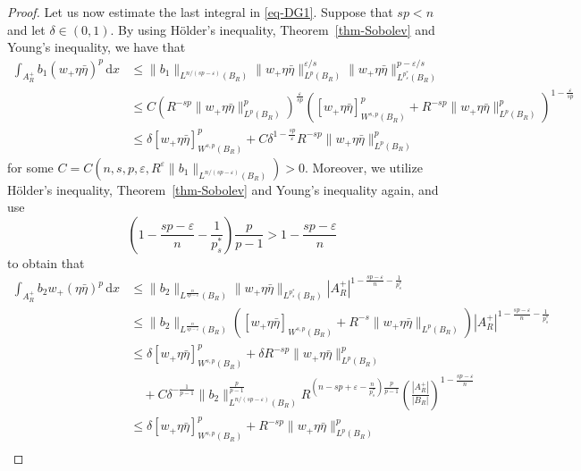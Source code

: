 \documentclass[11pt]{amsart}
\theoremstyle{plain}
\theoremstyle{definition}
\numberwithin{equation}{section}
\begin{document}
\begin{proof}
Let us now estimate the last integral in \eqref{eq-DG1}. Suppose that $sp < n$ and let $\delta \in (0,1)$. By using H\"older's inequality, Theorem~\ref{thm-Sobolev} and Young's inequality, we have that
\begin{equation*}
\begin{split}
\int_{A^+_R} b_1 (w_+\eta\bar{\eta})^{p} \,\mathrm{d}x
&\leq \|b_1\|_{L^{n/(sp-\varepsilon)}(B_R)} \|w_+\eta\bar{\eta}\|_{L^p(B_R)}^{\varepsilon/s} \|w_+\eta\bar{\eta}\|_{L^{p^{\ast}_{s}}(B_R)}^{p-\varepsilon/s} \\
&\leq C \left( R^{-sp} \|w_+\eta\bar{\eta}\|_{L^p(B_R)}^p \right)^{\frac{\varepsilon}{sp}} \left( [w_+\eta\bar{\eta}]_{W^{s, p}(B_R)}^p + R^{-sp} \|w_+\eta\bar{\eta}\|_{L^p(B_R)}^p \right)^{1-\frac{\varepsilon}{sp}} \\
&\leq \delta [w_+\eta\bar{\eta}]_{W^{s, p}(B_R)}^p + C \delta^{1-\frac{sp}{\varepsilon}} R^{-sp} \|w_+\eta\bar{\eta}\|_{L^p(B_R)}^p
\end{split}
\end{equation*}
for some $C=C(n, s, p, \varepsilon, R^\varepsilon \|b_1\|_{L^{n/(sp-\varepsilon)}(B_R)})>0$. Moreover, we utilize H\"older's inequality, Theorem~\ref{thm-Sobolev} and Young's inequality again, and use
\begin{equation*}
    \left(1-\frac{sp-\varepsilon}{n}-\frac{1}{p_s^{\ast}}\right)\frac{p}{p-1}>1-\frac{sp-\varepsilon}{n}
\end{equation*}
to obtain that
\begin{equation*}
\begin{split}
\int_{A^+_R} b_2 w_+ (\eta\bar{\eta})^p \,\mathrm{d}x
&\leq \|b_2\|_{L^{\frac{n}{sp-\varepsilon}}(B_R)} \|w_+\eta\bar{\eta}\|_{L^{p^{\ast}_{s}}(B_R)}|A^+_R|^{1-\frac{sp-\varepsilon}{n}-\frac{1}{p_s^{\ast}}}\\
&\leq \|b_2\|_{L^{\frac{n}{sp-\varepsilon}}(B_R)} \left( [w_+\eta\bar{\eta}]_{W^{s,p}(B_R)}+R^{-s}\|w_+\eta\bar{\eta}\|_{L^{p}(B_R)}\right) |A^+_R|^{1-\frac{sp-\varepsilon}{n}-\frac{1}{p_s^{\ast}}} \\
&\leq \delta [w_+\eta\bar{\eta}]_{W^{s, p}(B_R)}^p + \delta R^{-sp} \|w_+\eta\bar{\eta}\|^p_{L^{p}(B_R)}\\
&\quad + C\delta^{-\frac{1}{p-1}} \|b_2\|^{\frac{p}{p-1}}_{L^{n/(sp-\varepsilon)}(B_R)} R^{\left(n-sp+\varepsilon-\frac{n}{p_s^{\ast}}\right)\frac{p}{p-1}} \left(\frac{|A^+_R|}{|B_R|}\right)^{1-\frac{sp-\varepsilon}{n}}\\
&\leq \delta [w_+\eta\bar{\eta}]_{W^{s, p}(B_R)}^p + R^{-sp} \|w_+\eta\bar{\eta}\|^p_{L^{p}(B_R)} \\

\end{split}
\end{equation*}
\end{proof}
\end{document}
